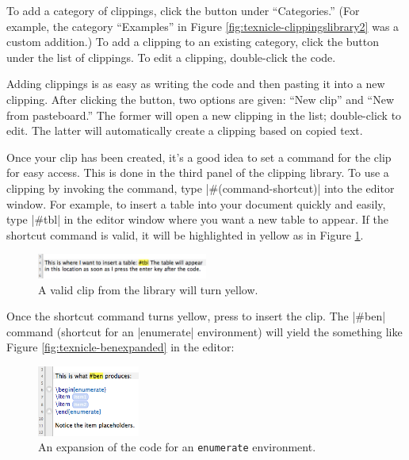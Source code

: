 To add a category of clippings, click the \menu{+} button under ``Categories.'' (For example, the category ``Examples'' in Figure \ref{fig:texnicle-clippingslibrary2} was a custom addition.) To add a clipping to an existing category, click the \menu{+} button under the list of clippings. To edit a clipping, double-click the code.

Adding clippings is as easy as writing the code and then pasting it into a new clipping. After clicking the \menu{+} button, two options are given: ``New clip'' and ``New from pasteboard.'' The former will open a new clipping in the list; double-click to edit. The latter will automatically create a clipping based on copied text.

Once your clip has been created, it's a good idea to set a command for the clip for easy access. This is done in the third panel of the clipping library. To use a clipping by invoking the command, type |#(command-shortcut)| into the editor window. For example, to insert a table into your document quickly and easily, type |#tbl| in the editor window where you want a new table to appear. If the shortcut command is valid, it will be highlighted in yellow as in Figure \ref{fig:texnicle-validclip}.


\begin{figure}[htbp]
\centering
\includegraphics[width=0.5\textwidth]{TeXnicle-Images/texnicle-validclip.png}
\caption{A valid clip from the library will turn yellow.}
\label{fig:texnicle-validclip}
\end{figure}


Once the shortcut command turns yellow, press \keys{\returnkey} to insert the clip. The |#ben| command (shortcut for an |enumerate| environment) will yield the something like Figure \ref{fig:texnicle-benexpanded} in the editor:
\begin{figure}[htbp]
\centering
\includegraphics[width=0.3\textwidth]{TeXnicle-Images/texnicle-expandedben.png}
\caption{An expansion of the code for an \texttt{enumerate} environment.}
\label{fig:texnicle-expandedben}
\end{figure}

